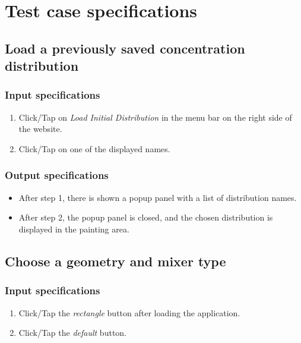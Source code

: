 \chapter{Test case specifications}

\section{Load a previously saved concentration distribution}

\subsection*{Input specifications}
\begin{enumerate}
\item Click/Tap on \emph{Load Initial Distribution} in the menu bar on the right side of the website.
\item Click/Tap on one of the displayed names.
\end{enumerate}

\subsection*{Output specifications}
\begin{itemize}
\item After step 1, there is shown a popup panel with a list of distribution names.
\item After step 2, the popup panel is closed, and the chosen distribution is displayed in the painting area.
\end{itemize}

\section{Choose a geometry and mixer type}

\subsection*{Input specifications}
\begin{enumerate}
\item Click/Tap the \emph{rectangle} button after loading the application.
\item Click/Tap the \emph{default} button.
\end{enumerate}

